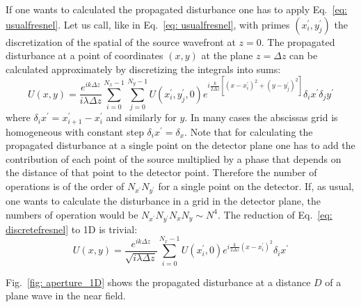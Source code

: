 \documentclass{iucr}              %
\begin{document}
If one wants to calculated the propagated disturbance one has to apply Eq.~\ref{eq: usualfresnel}. Let us call, like in Eq.~\ref{eq: usualfresnel}, with primes $(x^\prime_i,y^\prime_j)$ the discretization of the spatial of the source wavefront at $z=0$. The propagated disturbance at a point of coordinates $(x,y)$ at the plane $z=\Delta z$ can be calculated approximately by discretizing the integrals into sums: 
\begin{equation}\label{eq: discretefresnel}
 U(x,y) = \frac {e^{ik\Delta z }}{ i \lambda \Delta z} \sum_{i=0}^{N_x-1}  \sum_{j=0}^{N_y-1} U(x^\prime_i, y^\prime_j, 0) e^{i \frac{k}{2 \Delta z} [(x - x_i^\prime)^2 + (y - y_j^\prime)^2]} \delta_i x^\prime \delta_j y^\prime
\end{equation}
where $\delta_i x^\prime = x^\prime_{i+1} - x^\prime_i$ and similarly for $y$. In many cases the abscissas grid is homogeneous with constant step $\delta_i x^\prime = \delta_x$. Note that for calculating the propagated disturbance at a single point on the detector plane one has to add the contribution of each point of the source multiplied by a phase that depends on the distance of that point to the detector point. Therefore the number of operations is of the order of $N_{x^\prime}  N_{y^\prime}$ for a single point on the detector. If, as usual, one wants to calculate the disturbance in a grid in the detector plane, the numbers of operation would be $N_{x^\prime}  N_{y^\prime} N_{x}  N_{y} \sim N^4$. 
The reduction of Eq.~\ref{eq: discretefresnel} to 1D is trivial:
\begin{equation}\label{eq: discretefresnel1D}
 U(x,y) = \frac {e^{ik\Delta z }}{ \sqrt{i \lambda \Delta z}} \sum_{i=0}^{N_x-1}  U(x^\prime_i, 0) e^{i \frac{k}{2 \Delta z} (x - x_i^\prime)^2 } \delta_i x^\prime
\end{equation}


Fig.~\ref{fig: aperture_1D} shows the propagated disturbance at a distance $D$ of a plane wave in the near field.
\end{document}
